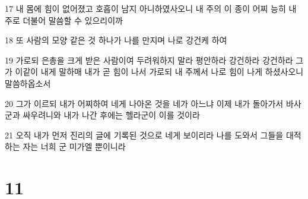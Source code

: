 \par 17 내 몸에 힘이 없어졌고 호흡이 남지 아니하였사오니 내 주의 이 종이 어찌 능히 내 주로 더불어 말씀할 수 있으리이까
\par 18 또 사람의 모양 같은 것 하나가 나를 만지며 나로 강건케 하여
\par 19 가로되 은총을 크게 받은 사람이여 두려워하지 말라 평안하라 강건하라 강건하라 그가 이같이 내게 말하매 내가 곧 힘이 나서 가로되 내 주께서 나로 힘이 나게 하셨사오니 말씀하옵소서
\par 20 그가 이르되 내가 어찌하여 네게 나아온 것을 네가 아느냐 이제 내가 돌아가서 바사 군과 싸우려니와 내가 나간 후에는 헬라군이 이를 것이라
\par 21 오직 내가 먼저 진리의 글에 기록된 것으로 네게 보이리라 나를 도와서 그들을 대적하는 자는 너희 군 미가엘 뿐이니라

\chapter{11}

